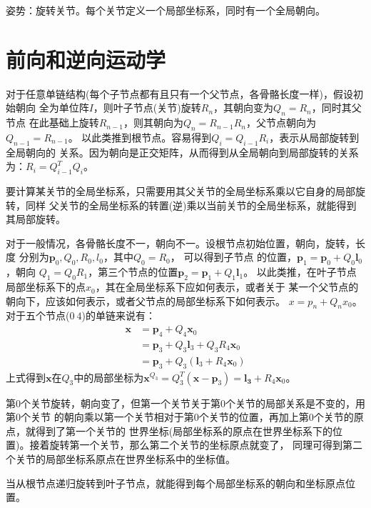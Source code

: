 \documentclass[lang=cn,newtx,10pt,scheme=chinese]{elegantbook}
\begin{document}
姿势：旋转关节。每个关节定义一个局部坐标系，同时有一个全局朝向。
\section{前向和逆向运动学}
对于任意单链结构(每个子节点都有且只有一个父节点，各骨骼长度一样)，假设初始朝向
全为单位阵$I$，则叶子节点(关节)旋转$R_n$，其朝向变为$Q_n = R_n$，同时其父节点
在此基础上旋转$R_{n-1}$，则其朝向为$Q_{n}=R_{n-1}R_{n}$，父节点朝向为$Q_{n-1}=R_{n-1}$。
以此类推到根节点。容易得到$Q_i = Q_{i-1}R_i$，表示从局部旋转到全局朝向的
关系。因为朝向是正交矩阵，从而得到从全局朝向到局部旋转的关系为：$R_i = Q_{i-1}^T Q_i$。

要计算某关节的全局坐标系，只需要用其父关节的全局坐标系乘以它自身的局部旋转，同样
父关节的全局坐标系的转置(逆)乘以当前关节的全局坐标系，就能得到其局部旋转。

对于一般情况，各骨骼长度不一，朝向不一。设根节点初始位置，朝向，旋转，长度
分别为$\boldsymbol{p}_0,Q_0, R_0, l_0$，其中$Q_0 = R_0$， 可以得到子节点
的位置，$\boldsymbol{p}_1 = \boldsymbol{p}_0 + Q_0 \boldsymbol{l}_0$，朝向
$Q_1 = Q_0 R_1$，第三个节点的位置$\boldsymbol{p}_2 = \boldsymbol{p}_1 + Q_1 \boldsymbol{l}_1$。
以此类推，在叶子节点局部坐标系下的点$x_0$，其在全局坐标系下应如何表示，或者关于
某一个父节点的朝向下，应该如何表示，或者父节点的局部坐标系下如何表示。
$x = p_n + Q_n x_0$。
对于五个节点($0~4$)的单链来说有：
\begin{equation}
  \begin{aligned}
  \boldsymbol{x} & =\boldsymbol{p}_4+Q_4 \boldsymbol{x}_0 \\
  & =\boldsymbol{p}_3+Q_3 \boldsymbol{l}_3+Q_3 R_4 \boldsymbol{x}_0 \\
  & =\boldsymbol{p}_3+Q_3\left(\boldsymbol{l}_3+R_4 \boldsymbol{x}_0\right)
  \end{aligned}
\end{equation}
上式得到$\boldsymbol{x}$在$Q_3$中的局部坐标为$\boldsymbol{x}^{Q_3}=
Q_{3}^{T}(\boldsymbol{x} - \boldsymbol{p}_3)=\boldsymbol{l_3}+R_4 \boldsymbol{x}_0$。

第0个关节旋转，朝向变了，但第一个关节关于第0个关节的局部关系是不变的，用第0个关节
的朝向乘以第一个关节相对于第0个关节的位置，再加上第0个关节的原点，就得到了第一个关节的
世界坐标(局部坐标系的原点在世界坐标系下的位置)。接着旋转第一个关节，那么第二个关节的坐标原点就变了，
同理可得到第二个关节的局部坐标系原点在世界坐标系中的坐标值。

当从根节点递归旋转到叶子节点，就能得到每个局部坐标系的朝向和坐标原点位置。
\end{document}
